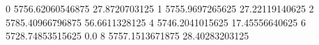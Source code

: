 0 5756.62060546875 27.8720703125
1 5755.9697265625 27.22119140625
2 5785.40966796875 56.6611328125
4 5746.2041015625 17.45556640625
6 5728.74853515625 0.0
8 5757.1513671875 28.40283203125
